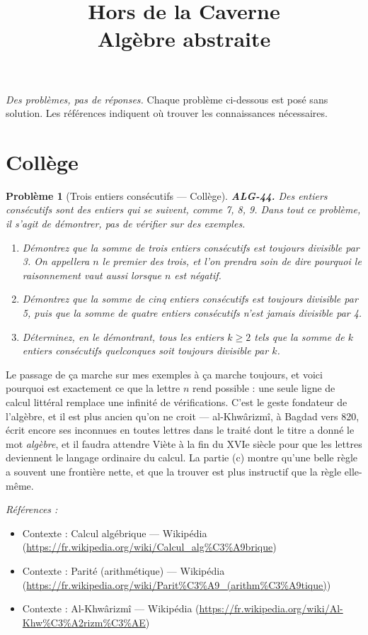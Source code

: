 \documentclass[11pt]{article}
\title{Hors de la Caverne \\ \Large Algèbre abstraite}
\author{}
\date{}
\newtheorem{problem}{Problème}
\newenvironment{refs}{\par\small\noindent\emph{Références :}\begin{itemize}\setlength\itemsep{0pt}}{\end{itemize}\normalsize}
\begin{document}
\maketitle
\noindent\emph{Des problèmes, pas de réponses.} Chaque problème ci-dessous est posé
sans solution. Les références indiquent où trouver les connaissances nécessaires.
\medskip


\section*{Collège}

\begin{problem}[{Trois entiers consécutifs --- Collège}]
\textbf{ALG-44.} Des entiers consécutifs sont des entiers qui se suivent, comme 7, 8, 9. Dans
tout ce problème, il s'agit de démontrer, pas de vérifier sur des exemples.
\begin{enumerate}
\item[(a)] Démontrez que la somme de trois entiers consécutifs est toujours divisible par 3. On appellera
$ n $ le premier des trois, et l'on prendra soin de dire pourquoi le raisonnement vaut aussi
lorsque $ n $ est négatif.
\item[(b)] Démontrez que la somme de cinq entiers consécutifs est toujours divisible par 5, puis que la
somme de quatre entiers consécutifs n'est jamais divisible par 4.
\item[(c)] Déterminez, en le démontrant, tous les entiers $ k \ge 2 $ tels que la somme de $ k $
entiers consécutifs quelconques soit toujours divisible par $ k $.
\end{enumerate}

\end{problem}

\noindent Le passage de \og{} ça marche sur mes exemples \fg{} à \og{} ça marche toujours, et voici
pourquoi \fg{} est exactement ce que la lettre $ n $ rend possible : une seule ligne de calcul
littéral remplace une infinité de vérifications. C'est le geste fondateur de l'algèbre, et il est
plus ancien qu'on ne croit --- al-Khwârizmî, à Bagdad vers 820, écrit encore ses inconnues en toutes
lettres dans le traité dont le titre a donné le mot \textit{algèbre}, et il faudra attendre Viète à
la fin du XVIe siècle pour que les lettres deviennent le langage ordinaire du calcul.
La partie (c) montre qu'une belle règle a souvent une frontière nette, et que la trouver est plus
instructif que la règle elle-même.

\begin{refs}
\item Contexte : Calcul algébrique --- Wikipédia (\url{https://fr.wikipedia.org/wiki/Calcul_alg%C3%A9brique})
\item Contexte : Parité (arithmétique) --- Wikipédia (\url{https://fr.wikipedia.org/wiki/Parit%C3%A9_(arithm%C3%A9tique)})
\item Contexte : Al-Khwârizmî --- Wikipédia (\url{https://fr.wikipedia.org/wiki/Al-Khw%C3%A2rizm%C3%AE})
\end{refs}
\end{document}
